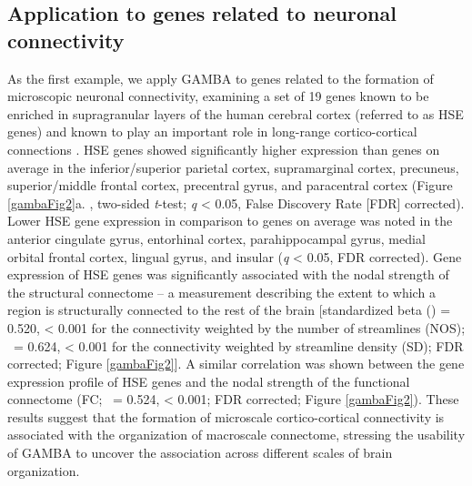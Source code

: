 \begin{refsection}
\subsection*{Application to genes related to neuronal connectivity}
As the first example, we apply GAMBA to genes related to the formation of microscopic neuronal connectivity, examining a set of 19 genes known to be enriched in supragranular layers of the human cerebral cortex (referred to as HSE genes) and known to play an important role in long-range cortico-cortical connections \citep{krienen2016transcriptional}. HSE genes showed significantly higher expression than genes on average in the inferior/superior parietal cortex, supramarginal cortex, precuneus, superior/middle frontal cortex, precentral gyrus, and paracentral cortex (Figure \ref{gambaFig2}a. , two-sided \textit{t}-test; \textit{q} < 0.05, False Discovery Rate [FDR] corrected). Lower HSE gene expression in comparison to genes on average was noted in the anterior cingulate gyrus, entorhinal cortex, parahippocampal gyrus, medial orbital frontal cortex, lingual gyrus, and insular (\textit{q} < 0.05, FDR corrected). Gene expression of HSE genes was significantly associated with the nodal strength of the structural connectome -- a measurement describing the extent to which a region is structurally connected to the rest of the brain [standardized beta (\textbeta) = 0.520, \pval < 0.001 for the connectivity weighted by the number of streamlines (NOS); \textbeta \ = 0.624, \pval < 0.001 for the connectivity weighted by streamline density (SD); FDR corrected; Figure \ref{gambaFig2}]. A similar correlation was shown between the gene expression profile of HSE genes and the nodal strength of the functional connectome (FC; \textbeta \ = 0.524, \pval < 0.001; FDR corrected; Figure \ref{gambaFig2}). These results suggest that the formation of microscale cortico-cortical connectivity is associated with the organization of macroscale connectome, stressing the usability of GAMBA to uncover the association across different scales of brain organization.


\end{refsection}

